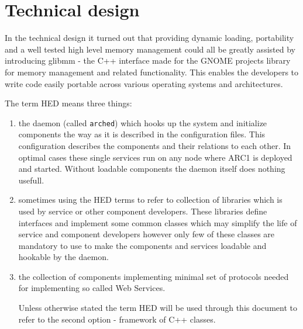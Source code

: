 \documentclass{book}
\begin{document}



\section{Technical design}

In the technical design it turned out that providing dynamic loading, portability and a well tested high level memory management could all be greatly assisted by introducing glibmm \cite{gtkmm} - the C++ interface made for the GNOME \cite{gnome} projects library for memory management and related functionality. This enables the developers to write code easily portable across various operating systems and architectures.


The term HED means three things:
\begin{enumerate}

\item the daemon (called \texttt{arched}) which hooks up the system and initialize components the way as it is described in the configuration files. This configuration describes the components and their relations to each other. In optimal cases these single services run on any node where ARC1 is deployed and started. Without loadable components the daemon itself does nothing usefull.

\item sometimes using the HED terms to refer to collection of libraries which is used by service or other component developers. These libraries define interfaces and implement some common classes which may simplify the life of service and component developers however only few of these classes are mandatory to use to make the components and services loadable and hookable by the daemon.

\item the collection of components implementing minimal set of protocols needed for implementing so called Web Services.

Unless otherwise stated the term HED will be used through this document to refer to the second option - framework of C++ classes.

\end{enumerate}
\end{document}
